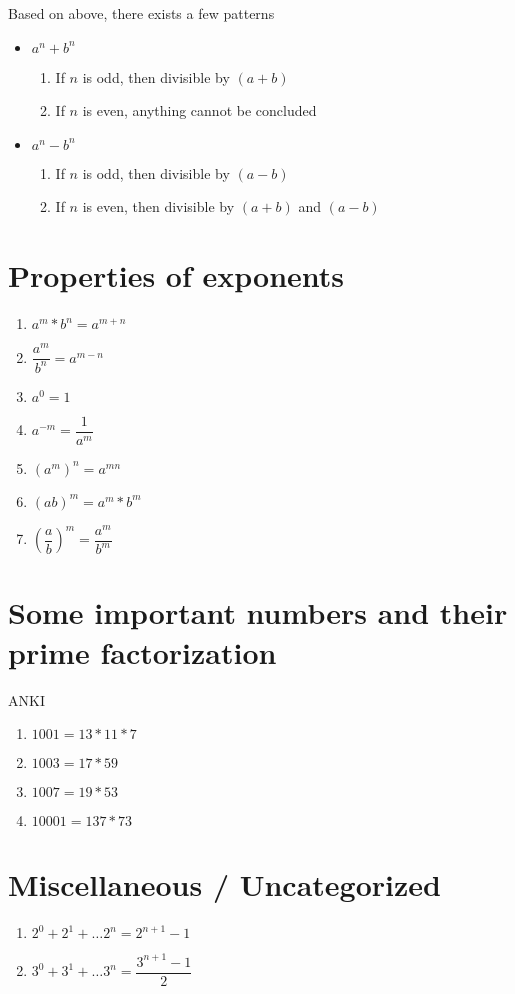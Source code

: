 Based on above, there exists a few patterns
\begin{itemize}
    \item $a^n + b^n$
    \begin{enumerate}
        \item If $n$ is odd, then divisible by $(a+b)$
        \item If $n$ is even, anything cannot be concluded
    \end{enumerate}

    \item $a^n - b^n$
    \begin{enumerate}
        \item If $n$ is odd, then divisible by $(a-b)$
        \item If $n$ is even, then divisible by $(a+b)$ and $(a-b)$
    \end{enumerate}
\end{itemize}

\section{Properties of exponents} \label{formulae:expo}
\begin{enumerate}
    \item $a^m * b^n = a^{m+n}$
    \item $\dfrac{a^m}{b^n} = a^{m-n}$
    \item $a^0 = 1$
    \item $a^{-m} = \dfrac{1}{a^m}$
    \item $(a^{m})^{n} = a^{mn}$
    \item $\left(ab \right)^{m} = a^m * b^m$
    \item $\left (\dfrac{a}{b} \right)^{m} = \dfrac{a^m}{b^m}$
\end{enumerate}

\section{Some important numbers and their prime factorization}

{ANKI}

\begin{enumerate}
    \item $1001 = 13 * 11 * 7 $
    \item $1003 = 17 * 59 $
    \item $1007 = 19 * 53 $
    \item $10001 = 137 * 73 $
\end{enumerate}

\section{Miscellaneous / Uncategorized}
\begin{enumerate}
    \item $2^0 + 2^1 + \ldots 2^n = 2^{n+1} - 1$
    \item $3^0 + 3^1 + \ldots 3^n = \dfrac{3^{n+1} - 1}{2}$
\end{enumerate}